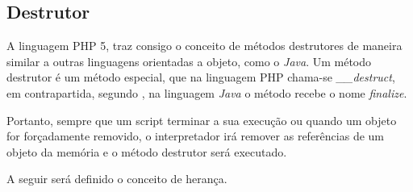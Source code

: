 \subsection{Destrutor}

A linguagem \acs{PHP} 5, traz consigo o conceito de métodos destrutores de maneira
similar a outras linguagens orientadas a objeto, como o \textit{Java}. Um método
destrutor é um método especial, que na linguagem \acs{PHP} chama-se
\textit{\_\_destruct}, em contrapartida, segundo , na
linguagem \textit{Java} o método recebe o nome \textit{finalize}.

Portanto, sempre que um script terminar a sua execução ou quando um objeto for
forçadamente removido, o interpretador irá remover as referências de um objeto
da memória e o método destrutor será executado.

A seguir será definido o conceito de herança.